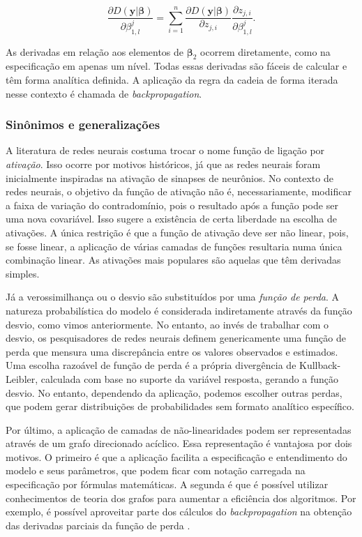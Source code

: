 \documentclass[12pt,]{report}
\begin{document}
\[
\frac{\partial D(\mathbf y|\boldsymbol\beta)}{\partial \beta_{1,l}^{j}} = \sum_{i=1}^n\frac{\partial D(\mathbf y|\boldsymbol\beta)}{\partial z_{j,i}} \frac{\partial z_{j,i}}{\partial \beta_{1,l}^{j}} .
\]

As derivadas em relação aos elementos de \(\boldsymbol \beta_2\) ocorrem
diretamente, como na especificação em apenas um nível. Todas essas
derivadas são fáceis de calcular e têm forma analítica definida. A
aplicação da regra da cadeia de forma iterada nesse contexto é chamada
de \emph{backpropagation}.

\subsubsection{Sinônimos e
generalizações}\label{sinonimos-e-generalizacoes}

A literatura de redes neurais costuma trocar o nome função de ligação
por \emph{ativação}. Isso ocorre por motivos históricos, já que as redes
neurais foram inicialmente inspiradas na ativação de sinapses de
neurônios. No contexto de redes neurais, o objetivo da função de
ativação não é, necessariamente, modificar a faixa de variação do
contradomínio, pois o resultado após a função pode ser uma nova
covariável. Isso sugere a existência de certa liberdade na escolha de
ativações. A única restrição é que a função de ativação deve ser não
linear, pois, se fosse linear, a aplicação de várias camadas de funções
resultaria numa única combinação linear. As ativações mais populares são
aquelas que têm derivadas simples.

Já a verossimilhança ou o desvio são substituídos por uma \emph{função
de perda}. A natureza probabilística do modelo é considerada
indiretamente através da função desvio, como vimos anteriormente. No
entanto, ao invés de trabalhar com o desvio, os pesquisadores de redes
neurais definem genericamente uma função de perda que mensura uma
discrepância entre os valores observados e estimados. Uma escolha
razoável de função de perda é a própria divergência de Kullback-Leibler,
calculada com base no suporte da variável resposta, gerando a função
desvio. No entanto, dependendo da aplicação, podemos escolher outras
perdas, que podem gerar distribuições de probabilidades sem formato
analítico específico.

Por último, a aplicação de camadas de não-linearidades podem ser
representadas através de um grafo direcionado acíclico. Essa
representação é vantajosa por dois motivos. O primeiro é que a aplicação
facilita a especificação e entendimento do modelo e seus parâmetros, que
podem ficar com notação carregada na especificação por fórmulas
matemáticas. A segunda é que é possível utilizar conhecimentos de teoria
dos grafos para aumentar a eficiência dos algoritmos. Por exemplo, é
possível aproveitar parte dos cálculos do \emph{backpropagation} na
obtenção das derivadas parciais da função de perda
\citep{abadi2016tensorflow}.
\end{document}
